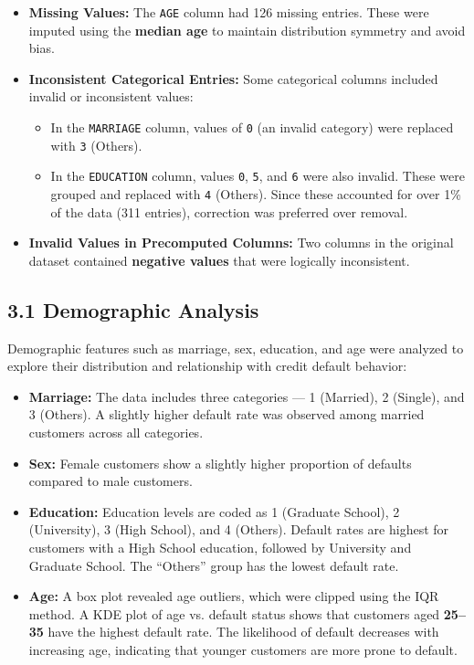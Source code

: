 \documentclass{article}
\begin{document}
\begin{itemize}
    \item \textbf{Missing Values:} The \texttt{AGE} column had 126 missing entries. These were imputed using the \textbf{median age} to maintain distribution symmetry and avoid bias.

    \item \textbf{Inconsistent Categorical Entries:} Some categorical columns included invalid or inconsistent values:
    \begin{itemize}
        \item In the \texttt{MARRIAGE} column, values of \texttt{0} (an invalid category) were replaced with \texttt{3} (Others).
        \item In the \texttt{EDUCATION} column, values \texttt{0}, \texttt{5}, and \texttt{6} were also invalid. These were grouped and replaced with \texttt{4} (Others). Since these accounted for over 1\% of the data (311 entries), correction was preferred over removal.
    \end{itemize}

    \item \textbf{Invalid Values in Precomputed Columns:} Two columns in the original dataset contained \textbf{negative values} that were logically inconsistent.
\end{itemize}


\subsection*{3.1 Demographic Analysis}

Demographic features such as marriage, sex, education, and age were analyzed to explore their distribution and relationship with credit default behavior:

\begin{itemize}
    \item \textbf{Marriage:} The data includes three categories — 1 (Married), 2 (Single), and 3 (Others). A slightly higher default rate was observed among married customers across all categories.

    \item \textbf{Sex:} Female customers show a slightly higher proportion of defaults compared to male customers.

    \item \textbf{Education:} Education levels are coded as 1 (Graduate School), 2 (University), 3 (High School), and 4 (Others). Default rates are highest for customers with a High School education, followed by University and Graduate School. The “Others” group has the lowest default rate.

    \item \textbf{Age:} A box plot revealed age outliers, which were clipped using the IQR method. A KDE plot of age vs. default status shows that customers aged \textbf{25–35} have the highest default rate. The likelihood of default decreases with increasing age, indicating that younger customers are more prone to default.
\end{itemize}
\end{document}

